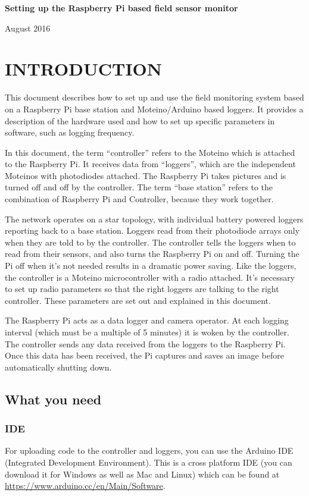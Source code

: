 \documentclass[10pt]{article}
\begin{document}
\begin{center}
\textbf{Setting up the Raspberry Pi based field sensor monitor}

August 2016
\end{center}
\newpage

\tableofcontents
\newpage

\section{INTRODUCTION}
This document describes how to set up and use the field monitoring system based on a Raspberry Pi base station and Moteino/Arduino based loggers. It provides a 
description of the hardware used and how to set up specific parameters in software, such as logging frequency. \break

In this document, the term ``controller'' refers to the Moteino which is attached to the Raspberry Pi. It receives data from ``loggers'', which are the independent
Moteinos with photodiodes attached. The Raspberry Pi takes pictures and is turned off and off by the controller. The term ``base station'' refers to the combination
of Raspberry Pi and Controller, because they work together. \break

The network operates on a star topology, with individual battery powered loggers reporting back to a base station. Loggers read from their photodiode arrays only when
they are told to by the controller. The controller tells the loggers when to read from their sensors, and also turns the Raspberry Pi on and off. Turning the Pi off when
it's not needed results in a dramatic power saving. Like the loggers, the controller is a Moteino microcontroller with a radio attached. It's necessary to set up radio
parameters so that the right loggers are talking to the right controller. These parameters are set out and explained in this document. \break

The Raspberry Pi acts as a data logger and camera operator. At each logging interval (which must be a multiple of 5 minutes) it is woken by the controller. The controller
sends any data received from the loggers to the Raspberry Pi. Once this data has been received, the Pi captures and saves an image before automatically shutting down.

\subsection{What you need}
\subsubsection{IDE}
For uploading code to the controller and loggers, you can use the Arduino IDE (Integrated Development Environment). This is a cross platform IDE (you can download it for
Windows as well as Mac and Linux) which can be found at \url{https://www.arduino.cc/en/Main/Software}. 
\end{document}

